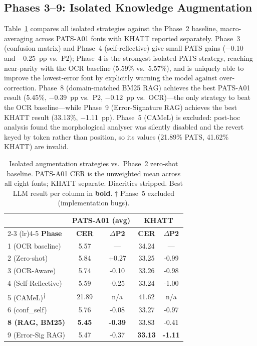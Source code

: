 \documentclass[conference]{IEEEtran}
\begin{document}
\subsection{Phases 3--9: Isolated Knowledge Augmentation}

Table~\ref{tab:isolated} compares all isolated strategies against the Phase~2
baseline, macro-averaging across PATS-A01 fonts with KHATT reported separately.
Phase~3 (confusion matrix) and Phase~4 (self-reflective) give small PATS gains
($-$0.10 and $-$0.25~pp vs.\ P2); Phase~4 is the strongest isolated PATS
strategy, reaching near-parity with the OCR baseline (5.59\% vs.\ 5.57\%), and
is uniquely able to improve the lowest-error font by explicitly warning the
model against over-correction. Phase~8 (domain-matched BM25 RAG) achieves the
best PATS-A01 result (5.45\%, $-$0.39~pp vs.\ P2, $-$0.12~pp vs.\ OCR)---the
only strategy to beat the OCR baseline---while Phase~9 (Error-Signature RAG)
achieves the best KHATT result (33.13\%, $-$1.11~pp). Phase~5 (CAMeL) is
excluded: post-hoc analysis found the morphological analyser was silently
disabled and the revert keyed by token rather than position, so its values
(21.89\% PATS, 41.62\% KHATT) are invalid.

\begin{table}[t]
\caption{Isolated augmentation strategies vs.\ Phase~2 zero-shot baseline.
PATS-A01 CER is the unweighted mean across all eight fonts; KHATT separate.
Diacritics stripped. Best LLM result per column in \textbf{bold}.
$\dagger$ Phase~5 excluded (implementation bugs).}
\label{tab:isolated}
\begin{center}
\small
\begin{tabular}{lcccc}
\toprule
& \multicolumn{2}{c}{\textbf{PATS-A01 (avg)}} & \multicolumn{2}{c}{\textbf{KHATT}} \\
\cmidrule(lr){2-3} \cmidrule(lr){4-5}
\textbf{Phase} & \textbf{CER} & \textbf{$\Delta$P2} & \textbf{CER} & \textbf{$\Delta$P2} \\
\midrule
1 (OCR baseline)         &  5.57 & ---    & 34.24 & ---   \\
2 (Zero-shot)            &  5.84 & +0.27  & 33.25 & -0.99 \\
\midrule
3 (OCR-Aware)            &  5.74 & -0.10  & 33.26 & -0.98 \\
4 (Self-Reflective)      &  5.59 & -0.25  & 33.24 & -1.00 \\
5 (CAMeL)\textsuperscript{$\dagger$} & 21.89 & n/a & 41.62 & n/a  \\
6 (conf\_self)           &  5.76 & -0.08  & 33.27 & -0.97 \\
\textbf{8 (RAG, BM25)}  &  \textbf{5.45} & \textbf{-0.39} & 33.83 & -0.41 \\
9 (Error-Sig RAG)        &  5.47 & -0.37  & \textbf{33.13} & \textbf{-1.11} \\
\bottomrule
\end{tabular}
\end{center}
\end{table}
\end{document}
